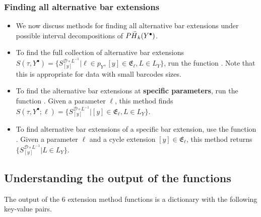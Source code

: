\documentclass{article}
\newcommand{\HH}{\smash{\widetilde{H}}}
\begin{document}
\subsubsection{Finding all alternative bar extensions} 
\begin{itemize}
\item We now discuss methods for finding all alternative bar extensions under possible interval decompositions of $P\HH_k(Y^{\bullet})$.
\item To find the full collection of alternative bar extensions $S(\tau, Y^{\bullet}) = \{ S^{\mathcal{D} \circ L^{-1}}_{[y]} | \ell \in p_Y, [y] \in \mathfrak{E}_{\ell}, L \in L_Y \}$, run the function . Note that this is appropriate for data with small barcodes sizes.
\item To find the alternative bar extensions at \textbf{specific parameters}, run the function . Given a parameter $\ell$, this method finds $S(\tau, Y^{\bullet}; \ell) = \{ S^{\mathcal{D} \circ L^{-1}}_{[y]} | [y] \in \mathfrak{E}_{\ell}, L \in L_Y \} $.
\item To find alternative bar extensions of a specific bar extension, use the function . Given a parameter $\ell$ and a cycle extension $[y] \in \mathfrak{E}_{\ell}$, this method returns $\{S^{\mathcal{D} \circ L^{-1}}_{[y]} | L \in L_Y \}$. 
\end{itemize}


\subsection{Understanding the output of the functions}
The output of the 6 extension method functions is a dictionary with the following key-value pairs.
\end{document}

